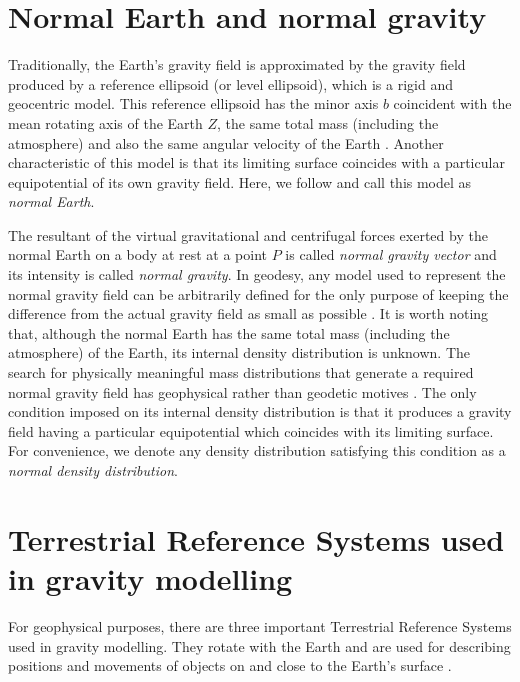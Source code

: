 \documentclass[extra]{gji}
\begin{document}
\section{Normal Earth and normal gravity}

Traditionally, the Earth's gravity field is approximated 
by the gravity field produced by a reference ellipsoid
(or level ellipsoid), which is a rigid and geocentric model.
This reference ellipsoid has the minor axis $b$ 
coincident with the mean rotating axis of the Earth $Z$, the 
same total mass (including the atmosphere) and also the
same angular velocity of the Earth \citep{heiskanen-moritz1967,
vanicek1987,hofmann-wellenhof-moritz2005,torge2012}.
Another characteristic of this model is that its
limiting surface coincides with a particular equipotential 
of its own gravity field.
Here, we follow \citep{torge2012} and call this model as
\textit{normal Earth}.

The resultant of the virtual 
gravitational and centrifugal forces exerted by the normal
Earth on a body at rest at a point $P$ is called 
\textit{normal gravity vector} and its intensity is called 
\textit{normal gravity}.
In geodesy, any model used to represent the normal gravity field
can be arbitrarily defined for the only purpose
of keeping the difference from the actual gravity field as small 
as possible \citep{vanicek1987}.
It is worth noting that, although the normal Earth has the
same total mass (including the atmosphere) of the Earth,
its internal density distribution is unknown.
The search for physically meaningful mass distributions 
that generate a required normal gravity field
has geophysical rather than geodetic motives \citep{marussi1974}.
The only condition imposed on its internal density
distribution is that it produces a gravity field
having a particular equipotential which coincides
with its limiting surface.
For convenience, we denote any density distribution 
satisfying this condition as a \textit{normal density distribution}.


\section{Terrestrial Reference Systems used in gravity modelling}

For geophysical purposes, there are three important Terrestrial Reference Systems used in gravity modelling. 
They rotate with the Earth and are used for describing
positions and movements of objects on and close to the Earth’s surface
\citep{torge2012}.
\end{document}

